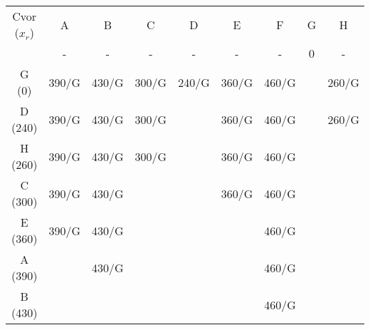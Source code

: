 \documentclass[12pt]{article}
\begin{document}
\begin{enumerate}
\begin{tabular}{|c|c|c|c|c|c|c|c|c|}
\hline
Cvor ($x_r$) & A                            & B                            & C                            & D                            & E                            & F                            & G                        & H                            \\ \cline{2-9} 
             & {\color[HTML]{000000} -}     & {\color[HTML]{333333} -}     & {\color[HTML]{333333} -}     & -                            & -                            & {\color[HTML]{333333} -}     & {\color[HTML]{FE0000} 0} & -                            \\ \hline
G (0)        & 390/G                        & 430/G                        & {\color[HTML]{333333} 300/G} & {\color[HTML]{FE0000} 240/G} & {\color[HTML]{333333} 360/G} & {\color[HTML]{333333} 460/G} & {\color[HTML]{333333} }  & 260/G                        \\ \hline
D (240)      & 390/G                        & 430/G                        & 300/G                        &                              & 360/G                        & {\color[HTML]{333333} 460/G} & {\color[HTML]{333333} }  & {\color[HTML]{FE0000} 260/G} \\ \hline
H (260)      & 390/G                        & 430/G                        & {\color[HTML]{FE0000} 300/G} & {\color[HTML]{333333} }      & {\color[HTML]{333333} 360/G} & 460/G                        & {\color[HTML]{333333} }  & {\color[HTML]{FE0000} }      \\ \hline
C (300)      & 390/G                        & 430/G                        & {\color[HTML]{000000} }      & {\color[HTML]{FE0000} }      & {\color[HTML]{FE0000} 360/G} & {\color[HTML]{333333} 460/G} & {\color[HTML]{333333} }  & {\color[HTML]{FE0000} }      \\ \hline
E (360)      & {\color[HTML]{FE0000} 390/G} & {\color[HTML]{333333} 430/G} & {\color[HTML]{FE0000} }      & {\color[HTML]{FE0000} }      & {\color[HTML]{FE0000} }      & 460/G                        & {\color[HTML]{FE0000} }  &                              \\ \hline
A (390)      & {\color[HTML]{333333} }      & {\color[HTML]{FE0000} 430/G} & {\color[HTML]{FE0000} }      & {\color[HTML]{FE0000} }      & {\color[HTML]{FE0000} }      & 460/G                        &                          &                              \\ \hline
B (430)      & {\color[HTML]{FE0000} }      & {\color[HTML]{FE0000} }      &                              &                              &                              & {\color[HTML]{FE0000} 460/G} &                          &                              \\ \hline

\end{tabular}
\end{enumerate}
\end{document}
